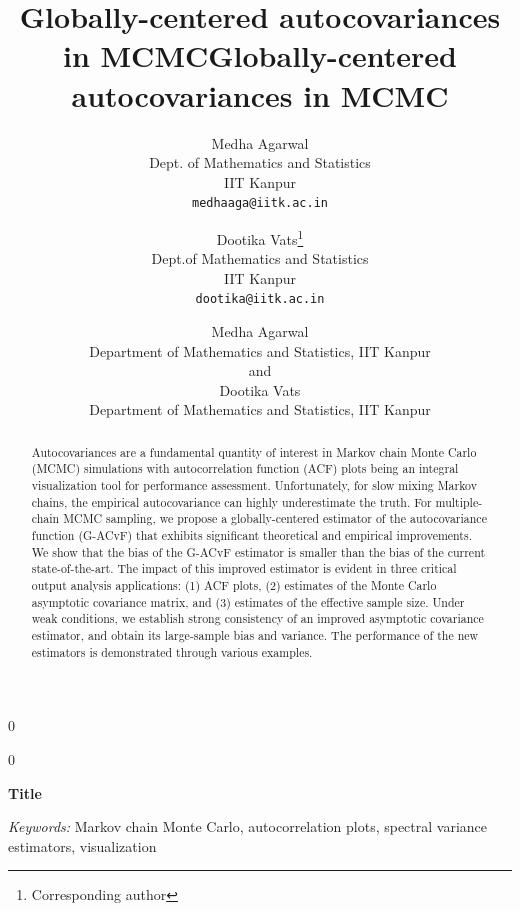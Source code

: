 \documentclass[12pt]{article}
\title{Globally-centered autocovariances in MCMC}
\author{
  Medha Agarwal \\
  Dept. of Mathematics and Statistics\\
  IIT Kanpur\\
  \texttt{medhaaga@iitk.ac.in} \and
 Dootika Vats\footnote{Corresponding author}\\
  Dept.of Mathematics and Statistics\\
  IIT Kanpur\\
  \texttt{dootika@iitk.ac.in}
}
\newcommand{\blind}{0}
\theoremstyle{remark}
\begin{document}
\def\spacingset#1{\renewcommand{\baselinestretch}%
{#1}\small\normalsize} \spacingset{1}



\blind
{
  \title{\bf Globally-centered autocovariances in MCMC}
  \author{Medha Agarwal\hspace{.2cm}\\
    Department of Mathematics and Statistics, IIT Kanpur\\
    and \\
    Dootika Vats \\
    Department of Mathematics and Statistics, IIT Kanpur}
  \maketitle
} \fi

\blind
{
  \bigskip
  \bigskip
  \bigskip
  \begin{center}
    {\LARGE\bf Title}
\end{center}
  \medskip
} \fi

\bigskip
\begin{abstract}
Autocovariances are a fundamental quantity of interest in Markov chain Monte Carlo (MCMC) simulations with autocorrelation function (ACF) plots being an integral visualization tool for performance assessment. Unfortunately, for slow mixing Markov chains, the empirical autocovariance can highly underestimate the truth. For multiple-chain MCMC sampling,  we propose a globally-centered estimator of the autocovariance function (G-ACvF) that exhibits significant theoretical and empirical improvements. We show that the bias of the G-ACvF estimator is smaller than the bias of the current state-of-the-art.  The impact of this improved estimator is evident in three critical output analysis applications: (1) ACF plots, (2) estimates of the Monte Carlo asymptotic covariance matrix, and (3) estimates of the effective sample size. Under weak conditions, we establish strong consistency of an improved asymptotic covariance estimator, and obtain its large-sample bias and variance.  The performance of the new estimators is demonstrated through various examples.
\end{abstract}

\noindent%
{\it Keywords:}  Markov chain Monte Carlo, autocorrelation plots, spectral variance estimators, visualization
\vfill

\newpage
\spacingset{1.5} %
\end{document}
